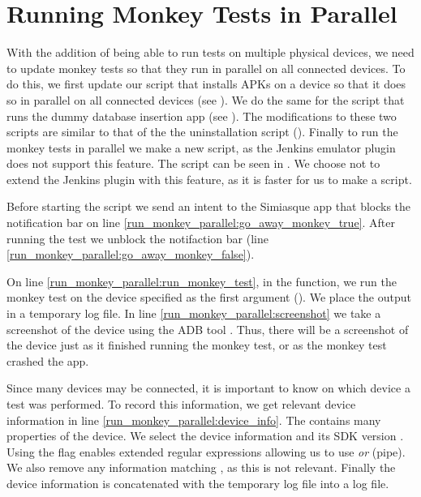 \section{Running Monkey Tests in Parallel}\label{sec:monkey_in_parallel}
With the addition of being able to run tests on multiple physical devices, we need to update monkey tests so that they run in parallel on all connected devices. To do this, we first update our script that installs APKs on a device so that it does so in parallel on all connected devices (see ). We do the same for the script that runs the dummy database insertion app (see ). The modifications to these two scripts are similar to that of the the uninstallation script (). Finally to run the monkey tests in parallel we make a new script, as the Jenkins emulator plugin does not support this feature. The script can be seen in . We choose not to extend the Jenkins plugin with this feature, as it is faster for us to make a script.

Before starting the script we send an intent to the Simiasque app that blocks the notification bar on line \ref{run_monkey_parallel:go_away_monkey_true}. After running the test we unblock the notifaction bar (line \ref{run_monkey_parallel:go_away_monkey_false}).

On line \ref{run_monkey_parallel:run_monkey_test}, in the  function, we run the monkey test on the device specified as the first argument (). We place the output in a temporary log file. In line \ref{run_monkey_parallel:screenshot} we take a screenshot of the device using the ADB tool \parencite{stackoverflow-adb-screencap2014}. Thus, there will be a screenshot of the device just as it finished running the monkey test, or as the monkey test crashed the app. 

Since many devices may be connected, it is important to know on which device a test was performed. To record this information, we get relevant device information in line \ref{run_monkey_parallel:device_info}. The  contains many properties of the device. We select the device information and its SDK version . Using the  flag enables extended regular expressions allowing us to use \emph{or} (pipe). We also remove any information matching , as this is not relevant. Finally the device information is concatenated with the temporary log file into a log file.


